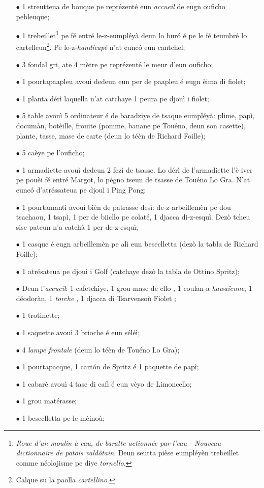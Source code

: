 \Scenographie
\begin{itemize}
\item[$\bullet$] 1 streutteua de bouque pe reprézenté eun \textit{accueil} de eugn ouficho pebleuque;
\item[$\bullet$] 1 trebeillet\footnote{ \textit{Roue d'un moulin à eau, de baratte actionnée par l'eau - Nouveau dictionnaire de patois vald\^otain}. Deun seutta pièse eumpléyèn trebeillet comme néolojisme pe diye \textit{tornello}.} pe fé entré le-z-eumpléyà deun lo bur\'o é pe le fé teumbré lo cartelleun\footnote{ Calque su la paolla \textit{cartellino}.}. Pe le-z-\textit{handicapé} n'at eunc\'o eun cantchel;
\item[$\bullet$] 3 fondal gri, ate 4 mètre pe reprézenté le meur d'eun ouficho;
\item[$\bullet$] 1 pourtapaapleu avouì dedeun eun per de paapleu é eugn èima di fiolet;
\item[$\bullet$] 1 planta dérì laquella n'at catchaye 1 peura pe djouì i fiolet;
\item[$\bullet$] 5 table avouì 5 ordinateur é de baradziye de tsaque eumpléyà: plime, papì, documàn, botèille, frouite (pomme, banane pe Touéno, deun son casette), plante, tasse, mase de carte (deun lo téèn de Richard Foille);
\item[$\bullet$] 5 caèye pe l'ouficho;
\item[$\bullet$] 1 armadiette avouì dedeun 2 fezì de tsasse. Lo dérì de l'armadiette l'è iver pe pouèi fé entré Margot, lo pégno tseun de tsasse de Touéno Lo Gra. N'at eunc\'o d'atréssateua pe djouì i Ping Pong;
\item[$\bullet$] 1 pourtamantì avouì bièn de patrasse desì: de-z-arbeillemèn pe dou tsachaou, 1 tsapì, 1 per de biicllo pe colaté, 1 djacca di-z-esquì.  Dezò tcheu sise pateun n'a catchà 1 per de-z-esquì;
\item[$\bullet$] 1 casque é eugn arbeillemèn pe alì eun beseclletta (dezò la tabla de Richard Foille);
\item[$\bullet$] 1 atrésateua pe djouì i Golf (catchaye dezò la tabla de Ottino Spritz);
\item[$\bullet$] Deun l'\textit{accueil}: 1 cafetchiye, 1 grou mase de cllo , 1 coulan-a \textit{hawaïenne}, 1 déodoràn, 1 \textit{torche} \torcia, 1 djacca di Tsarvensoù Fiolet ;
\item[$\bullet$] 1 trotinette;
\item[$\bullet$] 1 saquette avouì 3 brioche é eun séléì;
\item[$\bullet$] 4 \textit{lampe frontale} (deun lo téèn de Touéno Lo Gra);
\item[$\bullet$] 1 pourtapacque, 1 cart\'on de Spritz é 1 paquette de papì;
\item[$\bullet$] 1 cabarè avouì 4 tase di cafì é eun vèyo de Limoncello;
\item[$\bullet$] 1 grou matérasse;
\item[$\bullet$] 1 beseclletta pe le mèinoù;
\end{itemize}

